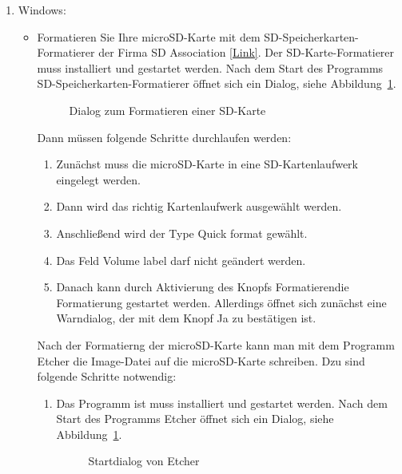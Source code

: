 \begin{enumerate}
  \item Windows:
	\begin{itemize}
		\item Formatieren Sie Ihre microSD-Karte mit dem SD-Speicherkarten-Formatierer der Firma SD Association \href{https://www.sdcard.org/downloads/formatter/}{[Link]}. Der SD-Karte-Formatierer muss installiert und gestartet werden.  Nach dem Start des Programms SD-Speicherkarten-Formatierer
		öffnet sich ein Dialog, siehe Abbildung~\ref{JetPack:SdFormatierer}.
		
		\begin{figure}
			\centering
			
			\caption{Dialog zum Formatieren einer SD-Karte}\label{JetPack:SdFormatierer}
		\end{figure}
		
        Dann müssen folgende Schritte durchlaufen werden:

		  
		\begin{enumerate}  	  
			\item Zunächst muss die microSD-Karte in eine SD-Kartenlaufwerk eingelegt werden.
			\item Dann wird das richtig Kartenlaufwerk ausgewählt werden.
			\item Anschließend wird der Type \glqq Quick format\grqq{} gewählt.
			\item Das Feld \glqq Volume label\grqq{} darf nicht geändert werden.
			\item Danach kann durch Aktivierung des Knopfs \glqq Formatieren\grqq die Formatierung gestartet werden. Allerdings öffnet sich zunächst eine Warndialog, der mit dem Knopf \glqq Ja\grqq{} zu bestätigen ist.
		\end{enumerate}
		
		Nach der Formatierng der microSD-Karte kann man mit dem Programm Etcher die Image-Datei auf die microSD-Karte schreiben. Dzu sind folgende Schritte notwendig:
		
		\begin{enumerate}  	      	
			
			\item  Das Programm ist muss installiert und gestartet werden. Nach dem Start des Programms Etcher öffnet sich ein Dialog, siehe Abbildung~\ref{JetPack:SdFormatierer}.
			
		    \begin{figure}
		      \centering
			  \caption{Startdialog von Etcher}\label{JetPack:Etcher}
		    \end{figure}
			

\end{enumerate}
\end{itemize}
\end{enumerate}
